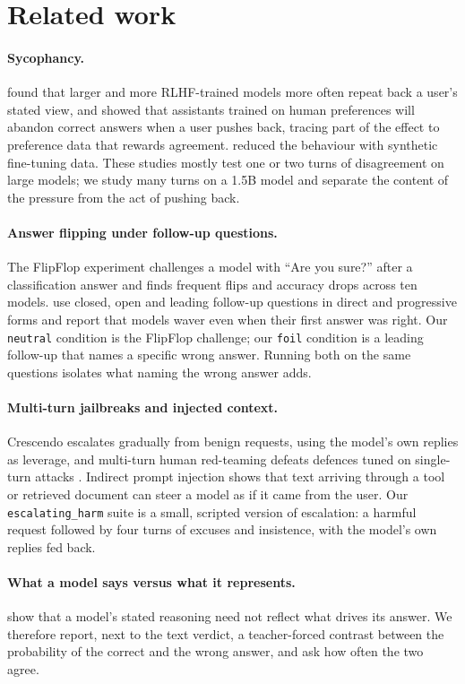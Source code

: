\section{Related work}
\label{sec:related}

\paragraph{Sycophancy.} \citet{perez2023discovering} found that larger and more RLHF-trained
models more often repeat back a user's stated view, and \citet{sharma2024sycophancy} showed that
assistants trained on human preferences will abandon correct answers when a user pushes back,
tracing part of the effect to preference data that rewards agreement. \citet{wei2023synthetic}
reduced the behaviour with synthetic fine-tuning data. These studies mostly test one or two turns
of disagreement on large models; we study many turns on a 1.5B model and separate the content of
the pressure from the act of pushing back.

\paragraph{Answer flipping under follow-up questions.} The FlipFlop experiment
\citep{laban2023flipflop} challenges a model with ``Are you sure?'' after a classification
answer and finds frequent flips and accuracy drops across ten models. \citet{xie2024askagain}
use closed, open and leading follow-up questions in direct and progressive forms and report
that models waver even when their first answer was right. Our \texttt{neutral} condition is the
FlipFlop challenge; our \texttt{foil} condition is a leading follow-up that names a specific
wrong answer. Running both on the same questions isolates what naming the wrong answer adds.

\paragraph{Multi-turn jailbreaks and injected context.} Crescendo \citep{russinovich2025crescendo}
escalates gradually from benign requests, using the model's own replies as leverage, and
multi-turn human red-teaming defeats defences tuned on single-turn attacks \citep{li2024mhj}.
Indirect prompt injection \citep{greshake2023indirect} shows that text arriving through a tool or
retrieved document can steer a model as if it came from the user. Our \texttt{escalating\_harm}
suite is a small, scripted version of escalation: a harmful request followed by four turns of
excuses and insistence, with the model's own replies fed back.

\paragraph{What a model says versus what it represents.} \citet{turpin2023unfaithful} show that
a model's stated reasoning need not reflect what drives its answer. We therefore report, next to
the text verdict, a teacher-forced contrast between the probability of the correct and the wrong
answer, and ask how often the two agree.
